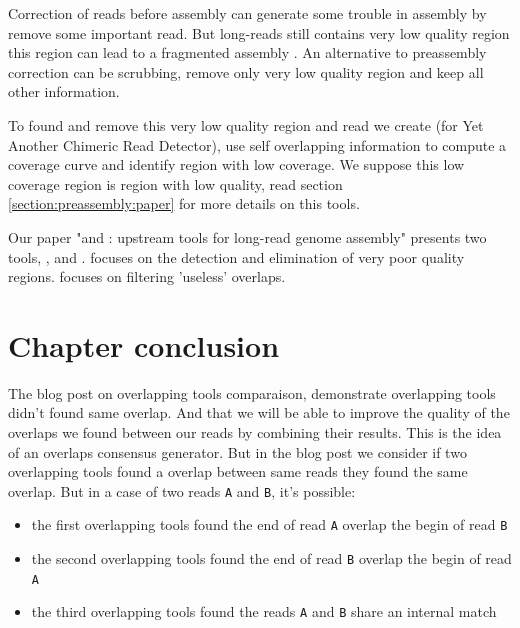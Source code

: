\documentclass[main.tex]{subfiles}
\begin{document}
Correction of reads before assembly can generate some trouble in assembly by remove some important read. But long-reads still contains very low quality region \cite{blog_post_error_repartition} this region can lead to a fragmented assembly \cite{long_read_assembler_comparison}. An alternative to preassembly correction can be scrubbing, remove only very low quality region and keep all other information.

To found and remove this very low quality region and read we create \yacrd (for Yet Another Chimeric Read Detector), \yacrd use self overlapping information to compute a coverage curve and identify region with low coverage. We suppose this low coverage region is region with low quality, read section \ref{section:preassembly:paper} for more details on this tools.


Our paper "\yacrd and \fpa: upstream tools for long-read genome assembly" presents two tools, \yacrd , and \fpa. \yacrd focuses on the detection and elimination of very poor quality regions. \fpa focuses on filtering 'useless' overlaps.





\section{Chapter conclusion}

The blog post on overlapping tools comparaison, demonstrate overlapping tools didn't found same overlap. And that we will be able to improve the quality of the overlaps we found between our reads by combining their results. This is the idea of an overlaps consensus generator. But in the blog post we consider if two overlapping tools found a overlap between same reads they found the same overlap. But in a case of two reads \texttt{A} and \texttt{B}, it's possible:
\begin{itemize}
    \item the first overlapping tools found the end of read \texttt{A} overlap the begin of read \texttt{B}
    \item the second overlapping tools found the end of read \texttt{B} overlap the begin of read \texttt{A}
    \item the third overlapping tools found the reads \texttt{A} and \texttt{B} share an internal match
\end{itemize}
\end{document}
